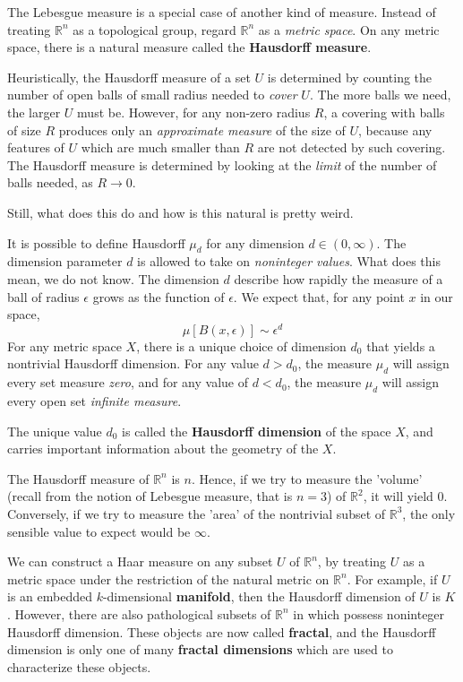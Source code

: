 \begin{example}
    The Lebesgue measure is a special case of another kind of measure. Instead of treating $\mathbb{R}^{n}$ as a topological group, regard $\mathbb{R}^{n}$ as a \textit{metric space}. On any metric space, there is a natural measure called the \textbf{Hausdorff measure}. 

Heuristically, the Hausdorff measure of a set $U$ is determined by counting the number of open balls of small radius needed to \textit{cover} $U$. The more balls we need, the larger $U$ must be. However, for any non-zero radius $R$, a covering with balls of size $R$ produces only an \textit{approximate measure} of the size of $U$, because any features of $U$ which are much smaller than $R$ are not detected by such covering. The Hausdorff measure is determined by looking at the \textit{limit} of the number of balls needed, as $R\to 0$. 
\end{example}
Still, what does this do and how is this natural is pretty weird. 

It is possible to define Hausdorff $\mu_{d}$ for any dimension $d\in(0,\infty)$. The dimension parameter $d$ is allowed to take on \textit{noninteger values}. What does this mean, we do not know. The dimension $d$ describe how rapidly the measure of a ball of radius $\epsilon$ grows as the function of $\epsilon$. We expect that, for any point $x$ in our space, $$\mu[B(x,\epsilon)]\sim \epsilon^{d}$$
For any metric space $X$, there is a unique choice of dimension $d_{0}$ that yields a nontrivial Hausdorff dimension. For any value $d>d_{0}$, the measure $\mu_{d}$ will assign every set measure \textit{zero}, and for any value of $d<d_{0}$, the measure $\mu_{d}$ will assign every open set \textit{infinite measure}. 

The unique value $d_{0}$ is called the \textbf{Hausdorff dimension} of the space $X$, and carries important information about the geometry of the $X$. 
\begin{example}
    The Hausdorff measure of $\mathbb{R}^{n}$ is $n$. Hence, if we try to measure the 'volume' (recall from the notion of Lebesgue measure, that is $n=3$) of $\mathbb{R}^{2}$, it will yield 0. Conversely, if we try to measure the 'area' of the nontrivial subset of $\mathbb{R}^3$, the only sensible value to expect would be $\infty$. 
\end{example}
We can construct a Haar measure on any subset $U$ of $\mathbb{R}^{n}$, by treating $U$ as a metric space under the restriction of the natural metric on $\mathbb{R}^{n}$. For example, if $U$ is an embedded $k$-dimensional \textbf{manifold}, then the Hausdorff dimension of $U$ is $K$. However, there are also pathological subsets of $\mathbb{R}^{n}$ in which possess noninteger Hausdorff dimension. These objects are now called \textbf{fractal}, and the Hausdorff dimension is only one of many \textbf{fractal dimensions} which are used to characterize these objects. 

